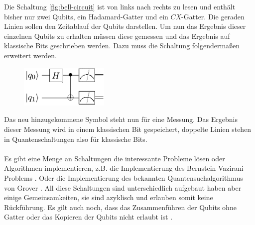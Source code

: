Die Schaltung \ref{fig:bell-circuit} ist von links nach rechts zu lesen und enth\"alt bisher nur zwei Qubits, ein Hadamard-Gatter und ein $CX$-Gatter. Die geraden Linien sollen den Zeitablauf der Qubits darstellen. Um nun das Ergebnis dieser einzelnen Qubits zu erhalten m\"ussen diese gemessen und das Ergebnis auf klassische Bits geschrieben werden. Dazu muss die Schaltung folgenderma\ss en erweitert werden.
\begin{figure}[h]
  \centering
  \includegraphics[width=0.38\textwidth]{figures/bell-measured.pdf}
\end{figure}
Das neu hinzugekommene Symbol steht nun f\"ur eine Messung. Das Ergebnis dieser Messung wird in einem klassischen Bit gespeichert, doppelte Linien stehen in Quantenschaltungen also f\"ur klassische Bits.\\\\
Es gibt eine Menge an Schaltungen die interessante Probleme l\"osen oder Algorithmen implementieren, z.B. die Implementierung des Bernstein-Vazirani Problems \cite{Du_2001}. Oder die Implementierung des bekannten Quantensuchalgorithmus von Grover \cite{Figgatt_2017}. All diese Schaltungen sind unterschiedlich aufgebaut haben aber einige Gemeinsamkeiten, sie sind azyklisch und erlauben somit keine R\"uckf\"uhrung. Es gilt auch noch, dass das Zusammenf\"uhren der Qubits ohne Gatter oder das Kopieren der Qubits nicht erlaubt ist \cite{nielsen_chuang_2010}.
